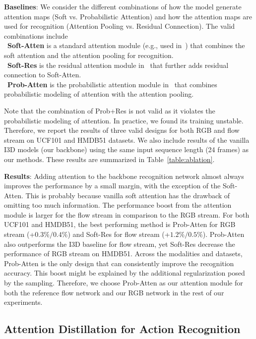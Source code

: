 \documentclass[10pt,twocolumn,letterpaper]{article}
\begin{document}
\noindent \textbf{Baselines}: We consider the different combinations of how the model generate attention maps (Soft vs. Probabilistic Attention) and how the attention maps are used for recognition (Attention Pooling vs. Residual Connection). The valid combinations include\\
\textbullet\ \textbf{Soft-Atten} is a standard attention module (e.g., used in~\cite{liu2018end}) that combines the soft attention and the attention pooling for recognition.\\
\textbullet\ \textbf{Soft-Res} is the residual attention module in~\cite{wang2017residual} that further adds residual connection to Soft-Atten. \\
\textbullet\ \textbf{Prob-Atten} is the probabilistic attention module in~\cite{Li_2018_ECCV} that combines probabilistic modeling of attention with the attention pooling.

Note that the combination of Prob+Res is not valid as it violates the probabilistic modeling of attention. In practice, we found its training unstable. Therefore, we report the results of three valid designs for both RGB and flow stream on UCF101 and HMDB51 datasets. We also include results of the vanilla I3D models (our backbone) using the same input sequence length (24 frames) as our methods. These results are summarized in Table~\ref{table:ablation}.

\noindent \textbf{Results}: Adding attention to the backbone recognition network almost always improves the performance by a small margin, with the exception of the Soft-Atten. This is probably because vanilla soft attention has the drawback of omitting too much information. The performance boost from the attention module is larger for the flow stream in comparison to the RGB stream. For both UCF101 and HMDB51, the best performing method is Prob-Atten for RGB stream (+$0.3\%/0.4\%$) and Soft-Res for flow stream (+$1.2\%/0.5\%$). Prob-Atten also outperforms the I3D baseline for flow stream, yet Soft-Res decrease the performance of RGB stream on HMDB51. Across the modalities and datasets, Prob-Atten is the only design that can consistently improve the recognition accuracy. This boost might be explained by the additional regularization posed by the sampling. Therefore, we choose Prob-Atten as our attention module for both the reference flow network and our RGB network in the rest of our experiments. 


\subsection{Attention Distillation for Action Recognition}
\end{document}
